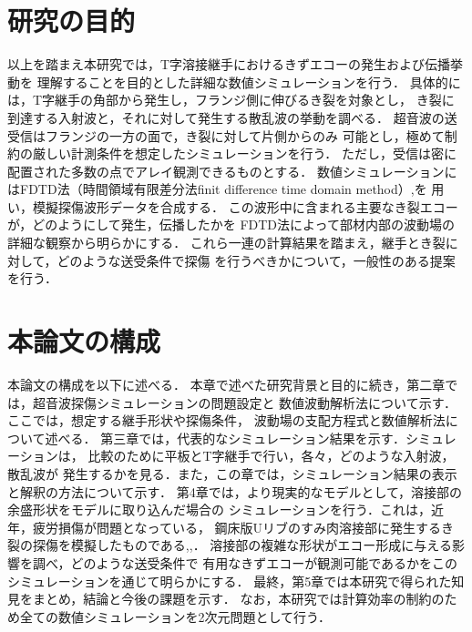 \section{研究の目的}
以上を踏まえ本研究では，T字溶接継手におけるきずエコーの発生および伝播挙動を
理解することを目的とした詳細な数値シミュレーションを行う．
具体的には，T字継手の角部から発生し，フランジ側に伸びるき裂を対象とし，
き裂に到達する入射波と，それに対して発生する散乱波の挙動を調べる．
超音波の送受信はフランジの一方の面で，き裂に対して片側からのみ
可能とし，極めて制約の厳しい計測条件を想定したシミュレーションを行う．
ただし，受信は密に配置された多数の点でアレイ観測できるものとする．
数値シミュレーションにはFDTD法（時間領域有限差分法finit difference time domain method）\cite{FDTD1},\cite{FDTD2}を
用い，模擬探傷波形データを合成する．
この波形中に含まれる主要なき裂エコーが，どのようにして発生，伝播したかを
FDTD法によって部材内部の波動場の詳細な観察から明らかにする．
これら一連の計算結果を踏まえ，継手とき裂に対して，どのような送受条件で探傷
を行うべきかについて，一般性のある提案を行う．
\section{本論文の構成}
本論文の構成を以下に述べる．
本章で述べた研究背景と目的に続き，第二章では，超音波探傷シミュレーションの問題設定と
数値波動解析法について示す．ここでは，想定する継手形状や探傷条件，
波動場の支配方程式と数値解析法について述べる．
第三章では，代表的なシミュレーション結果を示す．シミュレーションは，
比較のために平板とT字継手で行い，各々，どのような入射波，散乱波が
発生するかを見る．また，この章では，シミュレーション結果の表示と解釈の方法について示す．
第4章では，より現実的なモデルとして，溶接部の余盛形状をモデルに取り込んだ場合の
シミュレーションを行う．これは，近年，疲労損傷が問題となっている，
鋼床版Uリブのすみ肉溶接部に発生するき裂の探傷を模擬したものである\cite{Urib1},\cite{Urib2},\cite{Urib3}．
溶接部の複雑な形状がエコー形成に与える影響を調べ，どのような送受条件で
有用なきずエコーが観測可能であるかをこのシミュレーションを通じて明らかにする．
最終，第5章では本研究で得られた知見をまとめ，結論と今後の課題を示す．
なお，本研究では計算効率の制約のため全ての数値シミュレーションを2次元問題として行う．

